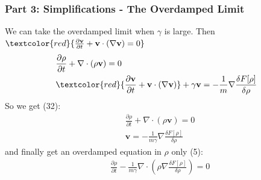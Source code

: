 \documentclass[aspectratio=169,xcolor=dvipsnames]{beamer}
\begin{document}
\begin{frame}
	\frametitle{Part 3: Simplifications - The Overdamped Limit}
	We can take the overdamped limit when $\gamma$ is large.
	Then $\textcolor{red}{\frac{\partial \mathbf{v}}{\partial t} + \mathbf{v} \cdot \left(\nabla \mathbf{v}\right) = 0}$
	\begin{align*}
	&\frac{\partial \rho}{\partial t} + \nabla \cdot \left(\rho \mathbf{v}\right) = 0 \\
	&\textcolor{red}{\frac{\partial \mathbf{v}}{\partial t} + \mathbf{v} \cdot \left(\nabla \mathbf{v}\right)} + \gamma \mathbf{v} = - \frac{1}{m}  \nabla \frac{\delta {F}[\rho]}{\delta \rho}
	\end{align*}
	So we get (32):
	\begin{align*}
	&\frac{\partial \rho}{\partial t} + \nabla \cdot \left(\rho \mathbf{v}\right) = 0 \\
	&\mathbf{v} = - \frac{1}{m \gamma} \nabla \frac{\delta F [\rho]}{\delta \rho}\textbf{}
	\end{align*}
	and finally get an overdamped equation in $\rho$ only (5):
	\begin{align*}
	&\frac{\partial \rho}{\partial t} -\frac{1}{m \gamma}  \nabla \cdot \left(\rho \nabla \frac{\delta {F}[\rho]}{\delta \rho}\textbf{}\right) = 0 
	\end{align*}
\end{frame}
\end{document}
